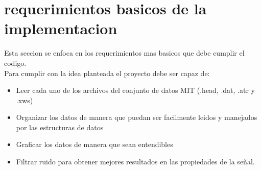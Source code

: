 \section{requerimientos basicos de la implementacion}
\label{sec:metodologia}

Esta seccion se enfoca en los requerimientos mas basicos que debe cumplir el codigo.
\\
Para cumplir con la idea planteada el proyecto debe ser capaz de:

\begin{itemize}
 \item Leer cada uno de los archivos del conjunto de datos MIT (.head, .dat, .atr y .xws) \cite{MIT-BIH}
 \item Organizar los datos de manera que puedan ser facilmente leidos y manejados por las estructuras de datos
 \item Graficar los datos de manera que sean entendibles
 \item Filtrar ruido para obtener mejores resultados en las propiedades de la señal.
\end{itemize}
